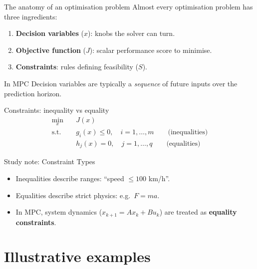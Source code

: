 \documentclass[aspectratio=169,10pt]{beamer}
\begin{document}
\begin{frame}{The anatomy of an optimisation problem}
Almost every optimisation problem has three ingredients:
\begin{enumerate}
  \item \textbf{Decision variables} ($x$): knobs the solver can turn.
  \item \textbf{Objective function} ($J$): scalar performance score to minimise.
  \item \textbf{Constraints}: rules defining feasibility ($S$).
\end{enumerate}

\begin{notebox}{In MPC}
Decision variables are typically a \emph{sequence} of future inputs over the prediction horizon.
\end{notebox}
\end{frame}

\begin{frame}{Constraints: inequality vs equality}
\begin{equation*}
\begin{aligned}
\min_x \quad & J(x)\\
\text{s.t.}\quad & g_i(x)\le 0,\quad i=1,\dots,m \qquad \text{(inequalities)}\\
& h_j(x)=0,\quad j=1,\dots,q \qquad \text{(equalities)}
\end{aligned}
\end{equation*}

\begin{notebox}{Study note: Constraint Types}
\begin{itemize}
  \item Inequalities describe ranges: ``speed $\le 100$ km/h''.
  \item Equalities describe strict physics: e.g.\ $F=ma$.
  \item In MPC, system dynamics ($x_{k+1}=Ax_k+Bu_k$) are treated as \textbf{equality constraints}.
\end{itemize}
\end{notebox}
\end{frame}

\section{Illustrative examples}
\end{document}
